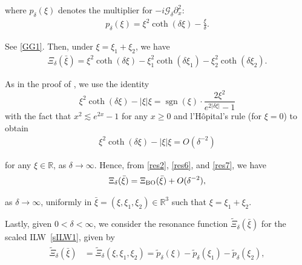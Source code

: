 \documentclass[letterpaper, 11pt,  reqno]{amsart}
\DeclareMathOperator{\sgn}{sgn}
\newcommand{\1}{\hspace{0.5mm}\textup{I}\hspace{0.5mm}}
\newcommand{\noi}{\noindent}
\newcommand{\R}{\mathbb{R}}
\newcommand{\al}{\alpha}
\newcommand{\dl}{\delta}
\newcommand{\wt}{\widetilde}
\newcommand{\dx}{\partial_x}
\newcommand{\Gdl}{\mathcal{G}_{\dl} }
\newcommand{\BO}{\text{\rm BO} }
\numberwithin{equation}{section}
\numberwithin{theorem}{section}
\begin{document}
\noi
where  $p_\dl(\xi)$ denotes the multiplier for $-i \Gdl \dx^2$:
\begin{align}
p_\dl(\xi)=
\xi^2 \coth(\dl \xi) -\frac{\xi}{\dl} .
\label{res5}
\end{align}


\noi
See \eqref{GG1}.
Then, under $\xi = \xi_1 + \xi_2$, we have
\begin{align}
\Xi_\dl (\bar \xi)
= 
 \xi^2 \coth(\dl \xi)
- \xi_1^2 \coth(\dl \xi_1)
- \xi_2^2 \coth(\dl \xi_2).
\label{res6}
\end{align}


\noi
As in the proof of \cite[Lemma 2.3]{CLOP}, we use the identity
\[
\xi^2 \coth (\dl \xi) - |\xi|\xi = \sgn(\xi) \cdot \frac {2\xi^2} {e^{2|\dl \xi|} - 1}
\]
with the fact that  \(x^2\lesssim e^{2x}-1\) for any \(x\geq 0\) and l'H\^opital's rule (for $\xi =0$) to obtain
\begin{align}
\xi^2 \coth (\dl \xi) - |\xi|\xi = O( \dl^{-2})
\label{res7}
\end{align}


%

\noi
for any $\xi \in \R$, as $\dl \to \infty$.
Hence, from \eqref{res2}, \eqref{res6},  and \eqref{res7}, 
we have
\begin{align}
\Xi_\dl(\bar \xi) =  \Xi_\BO(\bar \xi) + O(\dl^{-2}), 
\label{res8}
\end{align}

\noi
 as $\dl \to \infty$, 
uniformly in $\bar \xi = (\xi, \xi_1, \xi_2) \in \R^3$
such that $\xi = \xi_1 + \xi_2$.







Lastly, given $0 < \dl < \infty$, we consider the resonance function 
$\wt \Xi_\dl (\bar \xi)$  for the scaled ILW~\eqref{sILW1}, given by 
\begin{align}
\begin{split}
\wt \Xi_\dl (\bar \xi)
& = \wt \Xi_\dl(\xi,\xi_1,\xi_2) 
=  \wt p_\dl(\xi)  -  \wt  p_\dl(\xi_1) -  \wt p_\dl(\xi_2), 
\end{split}
\label{res9}
\end{align}
\end{document}
